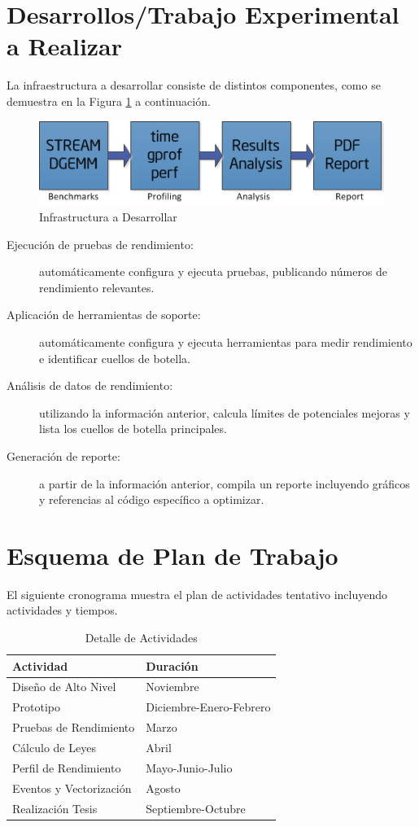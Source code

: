 \documentclass[a4paper]{article}
\begin{document}
\section{Desarrollos/Trabajo Experimental a Realizar}

La infraestructura a desarrollar consiste de distintos componentes, como se demuestra en la Figura \ref{fig:framework} a continuación.

\begin{figure}[H]
\centering
\includegraphics{framework.png}
\caption{Infrastructura a Desarrollar}
\label{fig:framework}
\end{figure}

  \begin{description}
  \item[Ejecución de pruebas de rendimiento:] automáticamente configura y ejecuta pruebas, publicando números de rendimiento relevantes.
  \item[Aplicación de herramientas de soporte:] automáticamente configura y ejecuta herramientas para medir rendimiento e identificar cuellos de botella.
  \item[Análisis de datos de rendimiento:] utilizando la información anterior, calcula límites de potenciales mejoras y lista los cuellos de botella principales.
  \item[Generación de reporte:] a partir de la información anterior, compila un reporte incluyendo gráficos y referencias al código específico a optimizar.
  \end{description}

\section{Esquema de Plan de Trabajo}

El siguiente cronograma muestra el plan de actividades tentativo incluyendo actividades y tiempos.

\begin{table}[H]
  \caption{Detalle de Actividades}
  \centering
    \begin{tabular}{|l|l|}\hline
      {\bf Actividad} & {\bf Duración} \\ \hline
      Diseño de Alto Nivel & Noviembre \\ \hline
      Prototipo & Diciembre-Enero-Febrero \\ \hline
      Pruebas de Rendimiento & Marzo \\ \hline
      Cálculo de Leyes & Abril \\ \hline
      Perfil de Rendimiento & Mayo-Junio-Julio \\ \hline
      Eventos y Vectorización & Agosto \\ \hline
      Realización Tesis & Septiembre-Octubre \\ \hline
    \end{tabular}
  \label{schedule}
\end{table}
\end{document}
